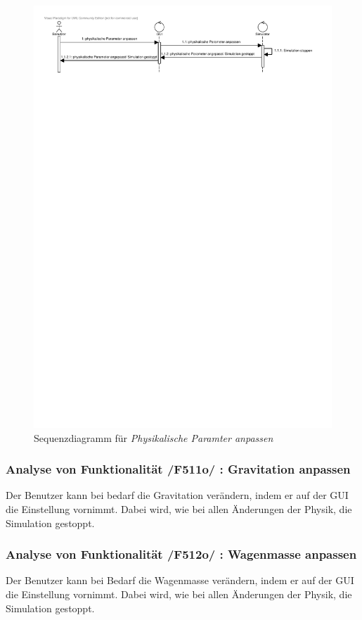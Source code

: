 \begin{figure}[!h]
\includegraphics[viewport = 0 25cm 20cm 30cm,width=\linewidth]{bilder/PhysikalischeParameter.pdf}
\caption{Sequenzdiagramm für \textit{Physikalische Paramter anpassen}}
\end{figure}

\subsubsection{Analyse von Funktionalität /F511o/ :  Gravitation anpassen}
Der Benutzer kann bei bedarf die Gravitation verändern, indem er auf der GUI die Einstellung vornimmt. Dabei wird, wie bei allen Änderungen der Physik, die Simulation gestoppt.
\subsubsection{Analyse von Funktionalität /F512o/ :  Wagenmasse anpassen}
Der Benutzer kann bei Bedarf die Wagenmasse verändern, indem er auf der GUI die Einstellung vornimmt. Dabei wird, wie bei allen Änderungen der Physik, die Simulation gestoppt.
